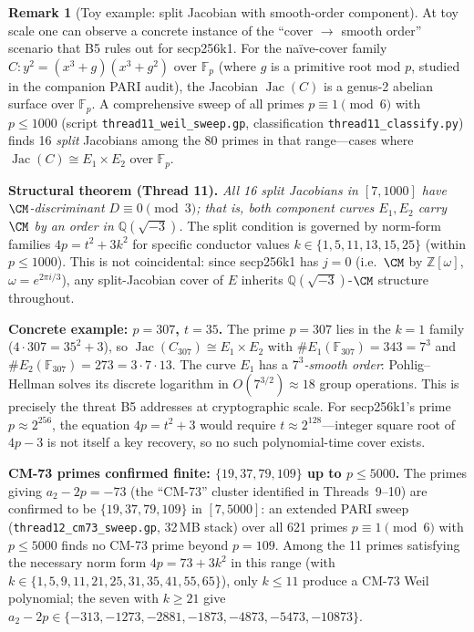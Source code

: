 \documentclass[11pt,a4paper]{article}
\theoremstyle{definition}
\newtheorem{remark}[theorem]{Remark}
\newcommand{\FF}{\mathbb{F}}
\newcommand{\ZZ}{\mathbb{Z}}
\newcommand{\QQ}{\mathbb{Q}}
\newcommand{\Jac}{\operatorname{Jac}}
\begin{document}
\begin{remark}[Toy example: split Jacobian with smooth-order component]
\label{rem:split-toy}
At toy scale one can observe a concrete instance of the ``cover $\to$ smooth order''
scenario that B5 rules out for secp256k1.  For the na\"ive-cover family
$C\colon y^2 = (x^3 + g)(x^3 + g^2)$ over $\FF_p$ (where $g$ is a primitive root
mod $p$, studied in the companion PARI audit), the Jacobian $\Jac(C)$ is a genus-2
abelian surface over $\FF_p$.  A comprehensive sweep of all primes $p \equiv 1
\pmod{6}$ with $p \le 1000$ (script \texttt{thread11\_weil\_sweep.gp},
classification \texttt{thread11\_classify.py}) finds 16 \emph{split} Jacobians
among the 80 primes in that range---cases where $\Jac(C) \cong E_1 \times E_2$
over $\FF_p$.

\medskip
\noindent\textbf{Structural theorem (Thread 11).}
\emph{All 16 split Jacobians in $[7, 1000]$ have $\CM$-discriminant $D \equiv 0
\pmod{3}$; that is, both component curves $E_1, E_2$ carry $\CM$ by an order in
$\QQ(\sqrt{-3})$.}
The split condition is governed by norm-form families $4p = t^2 + 3k^2$ for
specific conductor values $k \in \{1, 5, 11, 13, 15, 25\}$ (within $p \le 1000$).
This is not coincidental: since secp256k1 has $j = 0$ (i.e.\ $\CM$ by $\ZZ[\omega]$,
$\omega = e^{2\pi i/3}$), any split-Jacobian cover of $E$ inherits $\QQ(\sqrt{-3})$-$\CM$
structure throughout.

\medskip
\noindent\textbf{Concrete example: $p = 307$, $t = 35$.}
The prime $p = 307$ lies in the $k = 1$ family ($4 \cdot 307 = 35^2 + 3$), so
$\Jac(C_{307}) \cong E_1 \times E_2$ with $\#E_1(\FF_{307}) = 343 = 7^3$ and
$\#E_2(\FF_{307}) = 273 = 3 \cdot 7 \cdot 13$.  The curve $E_1$ has a \emph{$7^3$-smooth
order}: Pohlig--Hellman solves its discrete logarithm in
$O(7^{3/2}) \approx 18$ group operations.  This is precisely the threat B5 addresses
at cryptographic scale.  For secp256k1's prime $p \approx 2^{256}$, the equation
$4p = t^2 + 3$ would require $t \approx 2^{128}$---integer square root of $4p - 3$
is not itself a key recovery, so no such polynomial-time cover exists.

\medskip
\noindent\textbf{CM-73 primes confirmed finite: $\{19, 37, 79, 109\}$ up to $p \le 5000$.}
The primes giving $a_2 - 2p = -73$ (the ``CM-73'' cluster identified in
Threads~9--10) are confirmed to be $\{19, 37, 79, 109\}$ in $[7, 5000]$:
an extended PARI sweep (\texttt{thread12\_cm73\_sweep.gp}, 32\,MB stack) over
all 621 primes $p \equiv 1 \pmod{6}$ with $p \le 5000$ finds no CM-73 prime
beyond $p = 109$.  Among the 11 primes satisfying the necessary norm form
$4p = 73 + 3k^2$ in this range (with $k \in \{1,5,9,11,21,25,31,35,41,55,65\}$),
only $k \le 11$ produce a CM-73 Weil polynomial; the seven with $k \ge 21$
give $a_2 - 2p \in \{-313, -1273, -2881, -1873, -4873, -5473, -10873\}$.


\end{remark}
\end{document}
